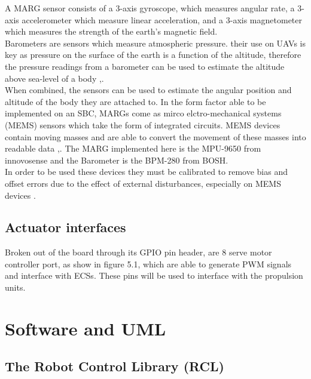 \documentclass[12pt,a4paper,twoside]{report}
\begin{document}
				A MARG sensor consists of a 3-axis gyroscope, which measures angular rate, a 3-axis accelerometer which measure linear acceleration, and a 3-axis magnetometer which measures the strength of the earth's magnetic field. 
				\\
				Barometers are sensors which measure atmospheric pressure. their use on UAVs is key as pressure on the surface of the earth is a function of the altitude, therefore the pressure readings from a barometer can be used to estimate the altitude above sea-level of a body \cite{20},\cite{29}.
				\\
				When combined, the sensors can be used to estimate the angular position and altitude of the body they are attached to. In the form factor able to be implemented on an SBC, MARGs come as mirco elctro-mechanical systems (MEMS) sensors which take the form of integrated circuits. MEMS devices contain moving masses and are able to convert the movement of these masses into readable data \cite{20},\cite{29}. The MARG implemented here is the MPU-9650 from innovosense and the Barometer is the BPM-280 from BOSH.
				\\
				In order to be used these devices they must be calibrated to remove bias and offset errors due to the effect of external disturbances, especially on MEMS devices \cite{29}. 
				
			\subsection{Actuator interfaces}
			
				Broken out of the board through its GPIO pin header, are 8 serve motor controller port, as show in figure 5.1, which are able to generate PWM signals and interface with ECSs. These pins will be used to interface with the propulsion units.
				
		\section{Software and UML}
		
			\subsection{The Robot Control Library (RCL)}
			
\end{document}
